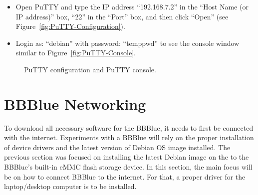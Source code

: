 \begin{mdframed}[frametitle=Testing OS with PuTTY, backgroundcolor=yellow!5, roundcorner=7pt,outerlinecolor= blue!70!black,outerlinewidth=1.2]
  \begin{itemize}
  \item Open PuTTY and type the IP address ``192.168.7.2'' in the ``Host Name (or IP address)'' box, ``22'' in the ``Port'' box, and then click ``Open''  (see Figure~\ref{fig:PuTTY-Configuration}). 
    
  \item Login as: ``debian'' with password: ``temppwd'' to see the console window similar to Figure~\ref{fig:PuTTY-Console}. 
  \end{itemize}
\end{mdframed}
%
\begin{figure}
  \centering
  \caption{ PuTTY configuration and  PuTTY console.}
  \label{fig:PuTTY1}
\end{figure}

\section{BBBlue Networking}
\label{sec:usbConn}
To download all necessary software for the BBBlue, it needs to first be connected with the internet. Experiments with a BBBlue will rely on the proper installation of device drivers and the latest version of Debian OS image installed. The previous section was focused on installing the latest Debian image on the to the BBBlue's built-in eMMC flash storage device. In this section, the main focus will be on how to connect BBBlue to the internet. For that, a proper driver for the laptop/desktop computer is to be installed.%

